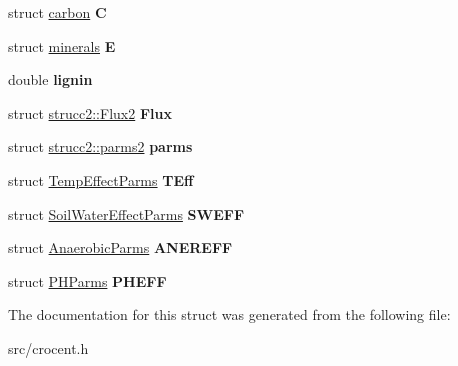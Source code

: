 \begin{DoxyCompactItemize}
\item 
\hypertarget{structstrucc2_a76ecf3392a5ee1997b804a7f0132f817}{struct \hyperlink{structcarbon}{carbon} {\bfseries C}}\label{structstrucc2_a76ecf3392a5ee1997b804a7f0132f817}

\item 
\hypertarget{structstrucc2_add5fc58ea6d075f01c8cf95daaca5d97}{struct \hyperlink{structminerals}{minerals} {\bfseries E}}\label{structstrucc2_add5fc58ea6d075f01c8cf95daaca5d97}

\item 
\hypertarget{structstrucc2_a1b7849e5e05ff1c0d6961b6aace939c8}{double {\bfseries lignin}}\label{structstrucc2_a1b7849e5e05ff1c0d6961b6aace939c8}

\item 
\hypertarget{structstrucc2_a354df6c1cb789e108cc1b822cf8e78f9}{struct \hyperlink{structstrucc2_1_1_flux2}{strucc2\-::\-Flux2} {\bfseries Flux}}\label{structstrucc2_a354df6c1cb789e108cc1b822cf8e78f9}

\item 
\hypertarget{structstrucc2_a84ee1777d223e1a198810997985b39c7}{struct \hyperlink{structstrucc2_1_1parms2}{strucc2\-::parms2} {\bfseries parms}}\label{structstrucc2_a84ee1777d223e1a198810997985b39c7}

\item 
\hypertarget{structstrucc2_aeca7c7dc94ab7d3b245d4a6259abc287}{struct \hyperlink{struct_temp_effect_parms}{Temp\-Effect\-Parms} {\bfseries T\-Eff}}\label{structstrucc2_aeca7c7dc94ab7d3b245d4a6259abc287}

\item 
\hypertarget{structstrucc2_a3347185aff63b9b0f3fa3074b5fb220d}{struct \hyperlink{struct_soil_water_effect_parms}{Soil\-Water\-Effect\-Parms} {\bfseries S\-W\-E\-F\-F}}\label{structstrucc2_a3347185aff63b9b0f3fa3074b5fb220d}

\item 
\hypertarget{structstrucc2_adbd139843efec99e629cfbb292d6f81b}{struct \hyperlink{struct_anaerobic_parms}{Anaerobic\-Parms} {\bfseries A\-N\-E\-R\-E\-F\-F}}\label{structstrucc2_adbd139843efec99e629cfbb292d6f81b}

\item 
\hypertarget{structstrucc2_a12b07f069c750d1c6a4aaa5622b84691}{struct \hyperlink{struct_p_h_parms}{P\-H\-Parms} {\bfseries P\-H\-E\-F\-F}}\label{structstrucc2_a12b07f069c750d1c6a4aaa5622b84691}

\end{DoxyCompactItemize}


The documentation for this struct was generated from the following file\-:\begin{DoxyCompactItemize}
\item 
src/crocent.\-h\end{DoxyCompactItemize}
